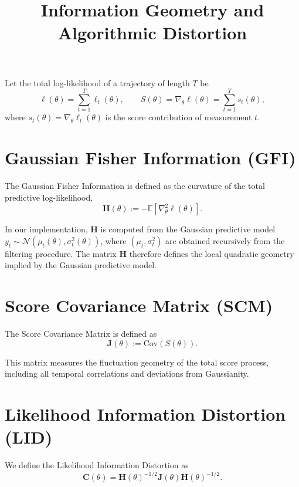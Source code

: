 \documentclass[11pt]{article}
\title{Information Geometry and Algorithmic Distortion}
\author{}
\date{}
\begin{document}
\maketitle

Let the total log-likelihood of a trajectory of length $T$ be
\begin{equation}
\ell(\theta) = \sum_{t=1}^T \ell_t(\theta),
\qquad
S(\theta) = \nabla_\theta \ell(\theta) = \sum_{t=1}^T s_t(\theta),
\end{equation}
where $s_t(\theta) = \nabla_\theta \ell_t(\theta)$ is the score contribution of measurement $t$.

\section*{Gaussian Fisher Information (GFI)}

The Gaussian Fisher Information is defined as the curvature of the total predictive log-likelihood,
\begin{equation}
\mathbf H(\theta) := -\mathbb{E}\left[ \nabla_\theta^2 \ell(\theta) \right].
\end{equation}

In our implementation, $\mathbf H$ is computed from the Gaussian predictive model
$y_t \sim \mathcal{N}(\mu_t(\theta), \sigma_t^2(\theta))$,
where $(\mu_t,\sigma_t^2)$ are obtained recursively from the filtering procedure.
The matrix $\mathbf H$ therefore defines the local quadratic geometry implied by the Gaussian predictive model.

\section*{Score Covariance Matrix (SCM)}

The Score Covariance Matrix is defined as
\begin{equation}
\mathbf J(\theta) := \mathrm{Cov}\!\left( S(\theta) \right).
\end{equation}

This matrix measures the fluctuation geometry of the total score process,
including all temporal correlations and deviations from Gaussianity.

\section*{Likelihood Information Distortion (LID)}

We define the Likelihood Information Distortion as
\begin{equation}
\mathbf C(\theta)
=
\mathbf H(\theta)^{-1/2}
\mathbf J(\theta)
\mathbf H(\theta)^{-1/2}.
\end{equation}
\end{document}
